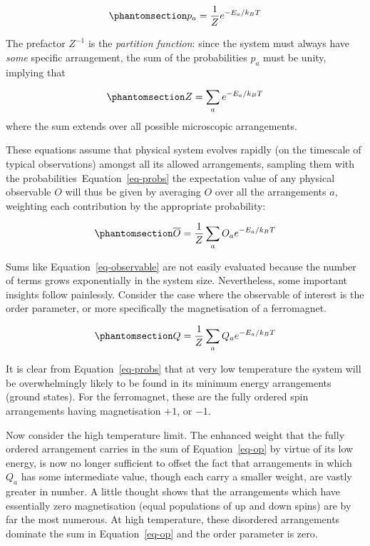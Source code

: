 \documentclass[
  letterpaper,
  DIV=11,
  numbers=noendperiod]{scrreprt}
\begin{document}
\begin{equation}\phantomsection\label{eq-probs}{
p_a=\frac{1}{Z}e^{-E_a/k_BT}
}\end{equation}

The prefactor \(Z^{-1}\) is the \emph{partition function}: since the
system must always have \emph{some} specific arrangement, the sum of the
probabilities \(p_a\) must be unity, implying that

\begin{equation}\phantomsection\label{eq-partition}{
Z=\sum_ae^{-E_a/k_BT}
}\end{equation} where the sum extends over all possible microscopic
arrangements.

These equations assume that physical system evolves rapidly (on the
timescale of typical observations) amongst all its allowed arrangements,
sampling them with the probabilities~Equation~\ref{eq-probs} the
expectation value of any physical observable \(O\) will thus be given by
averaging \(O\) over all the arrangements \(a\), weighting each
contribution by the appropriate probability:

\begin{equation}\phantomsection\label{eq-observable}{\overline {O}=\frac{1}{Z}\sum_a O_a e^{-E_a/k_BT}
}\end{equation}

Sums like Equation~\ref{eq-observable} are not easily evaluated because
the number of terms grows exponentially in the system size.
Nevertheless, some important insights follow painlessly. Consider the
case where the observable of interest is the order parameter, or more
specifically the magnetisation of a ferromagnet.

\begin{equation}\phantomsection\label{eq-op}{
Q=\frac{1}{Z}\sum_a Q_a e^{-E_a/k_BT}
}\end{equation}

It is clear from Equation~\ref{eq-probs} that at very low temperature
the system will be overwhelmingly likely to be found in its minimum
energy arrangements (ground states). For the ferromagnet, these are the
fully ordered spin arrangements having magnetisation \(+1\), or \(-1\).

Now consider the high temperature limit. The enhanced weight that the
fully ordered arrangement carries in the sum of Equation~\ref{eq-op} by
virtue of its low energy, is now no longer sufficient to offset the fact
that arrangements in which \(Q_a\) has some intermediate value, though
each carry a smaller weight, are vastly greater in number. A little
thought shows that the arrangements which have essentially zero
magnetisation (equal populations of up and down spins) are by far the
most numerous. At high temperature, these disordered arrangements
dominate the sum in Equation~\ref{eq-op} and the order parameter is
zero.
\end{document}
